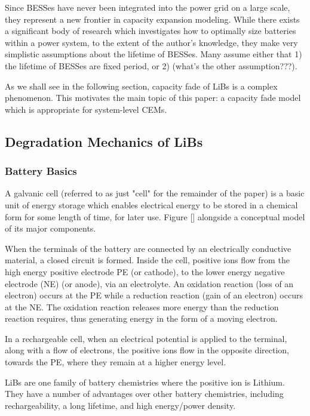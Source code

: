 \documentclass[conference]{IEEEtran}
\begin{document}
Since BESSes have never been integrated into the power grid on a large scale, they represent a new frontier in capacity expansion modeling.
While there exists a significant body of research which investigates how to optimally size batteries within a power system, to the extent of the author's knowledge,
they make very simplistic assumptions about the lifetime of BESSes. Many assume either that 1) the lifetime of BESSes are fixed period, or 2)
(what's the other assumption???). 

As we shall see in the following section, capacity fade of LiBs is a complex phenomenon. This motivates the main topic of this paper:
a capacity fade model which is appropriate for system-level CEMs.

\subsection{Degradation Mechanics of LiBs}

\subsubsection{Battery Basics}

A galvanic cell (referred to as just "cell" for the remainder of the paper)
is a basic unit of energy storage which enables electrical energy
to be stored in a chemical form for some length of time, for later use.
Figure [] alongside a conceptual model of its major components.

When the terminals
of the battery are connected by an electrically conductive material, a closed circuit
is formed. Inside the cell, positive ions flow from the high energy
positive electrode PE (or cathode), to the lower energy negative electrode (NE)
(or anode), via an electrolyte. An oxidation reaction (loss of an electron) occurs at the PE
while a reduction reaction (gain of an electron) occurs at the NE. The oxidation
reaction releases more energy than the reduction reaction requires, thus
generating energy in the form of a moving electron.

In a rechargeable cell, when an electrical potential is applied to
the terminal, along with a flow of electrons, the positive ions flow
in the opposite direction, towards the PE, where they remain at a 
higher energy level.

LiBs are one family of battery chemistries where the positive ion
is Lithium. They have a number of advantages over other battery
chemistries, including rechargeability, a long lifetime, and high
energy/power density.
\end{document}
